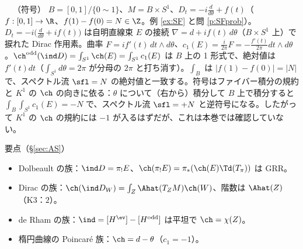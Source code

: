 \begin{ex}\label{ex:oddfam}\tP\ \tQ\ （符号）
$B=[0,1]/\{0\sim1\}$、$M=B\times S^1$、$D_t=-i\frac d{d\theta}+f(t)$（$f:[0,1]\to\R$、$f(1)-f(0)=N\in\Z$。例 \ref{ex:SF} と問 \ref{p:SFprob}）。$D_t=-i\bigl(\frac d{d\theta}+if(t)\bigr)$ は自明直線束 $E$ の接続 $\nabla=d+if(t)\,d\theta$（$B\times S^1$ 上）で捩れた Dirac 作用素。曲率 $F=if'(t)\,dt\wedge d\theta$、$c_1(E)=\frac i{2\pi}F=-\frac{f'(t)}{2\pi}dt\wedge d\theta$。$\ch^{\rm odd}(\ind D)=\int_{S^1}\ch(E)=\int_{S^1}c_1(E)$ は $B$ 上の 1 形式で、絶対値は $f'(t)dt$（$\int_{S^1}d\theta=2\pi$ が分母の $2\pi$ と打ち消す）。$\int_B$ は $|f(1)-f(0)|=|N|$ で、スペクトル流 $\sfl=N$ の絶対値と一致する。符号はファイバー積分の規約と $K^1$ の $\ch$ の向きに依る\tQ：$\theta$ について（右から）積分して $B$ 上で積分すると $\int_B\int_{S^1}c_1(E)=-N$ で、スペクトル流 $\sfl=+N$ と逆符号になる。したがって $K^1$ の $\ch$ の規約には $-1$ が入るはずだが、これは本巻では確認していない。
\end{ex}
\begin{keybox}{要点（\S\ref{sec:AS}）}
\begin{itemize}
\item Dolbeault の族：$\ind D=\pi_!E$、$\ch(\pi_!E)=\pi_*(\ch(E)\Td(T_\pi))$ は GRR。
\item Dirac の族：$\ch(\ind D_W)=\int_Z\Ahat(T_ZM)\ch(W)$、階数は $\Ahat(Z)$（K3：$2$）。
\item de Rham の族：$\ind=[H^{\ev}]-[H^{\rm odd}]$ は平坦で $\ch=\chi(Z)$。
\item 楕円曲線の Poincaré 族：$\ch=d-\theta$（$c_1=-1$）。
\end{itemize}
\end{keybox}

